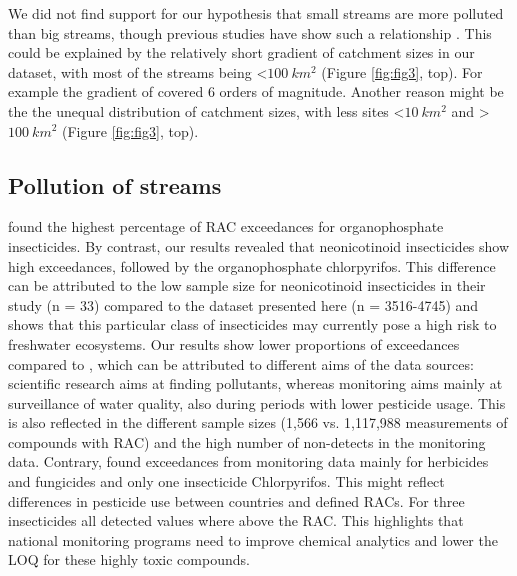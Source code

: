 \documentclass[journal=esthag,manuscript=article]{achemso}
\begin{document}
We did not find support for our hypothesis that small streams are more polluted than big streams, though previous studies have show such a relationship \citep{schulz_field_2004,stehle_pesticide_2015,knauer_pesticides_2016}.
%
%
%
%
This could be explained by the relatively short gradient of catchment sizes in our dataset, with most of the streams being \textless $100~km^2$ (Figure \ref{fig:fig3}, top).
For example the gradient of \citet{schulz_field_2004} covered 6 orders of magnitude.
%
%
Another reason might be the the unequal distribution of catchment sizes, with less sites \textless $10~km^2$ and \textgreater $100~km^2$ (Figure \ref{fig:fig3}, top).


\subsection{Pollution of streams}
\citet{stehle_pesticide_2015} found the highest percentage of RAC exceedances for organophosphate insecticides. 
By contrast, our results revealed that neonicotinoid insecticides show high exceedances, followed by the organophosphate chlorpyrifos. 
This difference can be attributed to the low sample size for neonicotinoid insecticides in their study (n = 33) compared to the dataset presented here (n = 3516-4745) and shows that this particular class of insecticides may currently pose a high risk to freshwater ecosystems.
%
%
Our results show lower proportions of exceedances compared to \citet{stehle_pesticide_2015}, which can be attributed to different aims of the data sources: scientific research aims at finding pollutants, whereas monitoring aims mainly at surveillance of water quality, also during periods with lower pesticide usage. 
%
%
This is also reflected in the different sample sizes (1,566 vs. 1,117,988 measurements of compounds with RAC) and the high number of non-detects in the monitoring data.
%
%
Contrary, \citet{knauer_pesticides_2016} found exceedances from monitoring data mainly for herbicides and fungicides and only one insecticide Chlorpyrifos.
This might reflect differences in pesticide use between countries and defined RACs.
%
%
For three insecticides all detected values where above the RAC.
This highlights that national monitoring programs need to improve chemical analytics and lower the LOQ for these highly toxic compounds.
\end{document}

